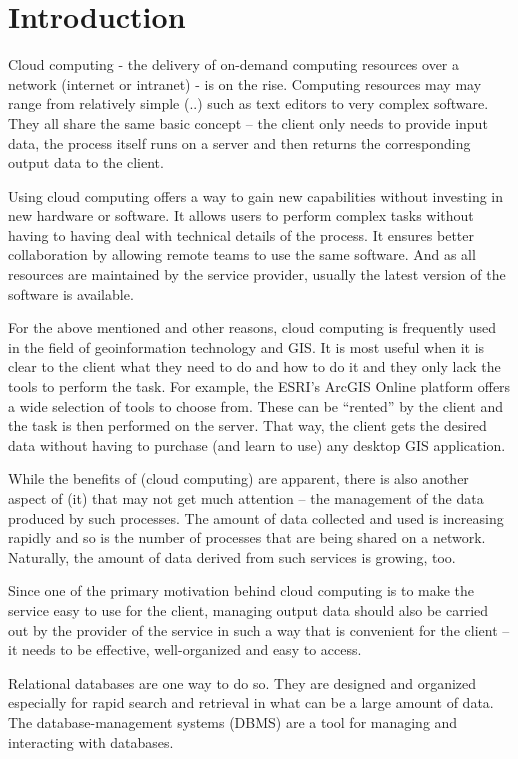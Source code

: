 \chapter{Introduction}
\label{1-introduction}

	Cloud computing - the delivery of on-demand computing resources over a network (internet or intranet) -  is on the rise. Computing resources may may range from relatively simple (..) such as text editors to very complex software. They all share the same basic concept – the client only needs to provide input data, the process itself runs on a server and then returns the corresponding output data to the client.

Using cloud computing offers a way to gain new capabilities without investing in new hardware or software. It allows users to perform complex tasks without having to having deal with technical details of the process. It ensures better collaboration by allowing remote teams to use the same software. And as all resources are maintained by the service provider, usually the latest version of the software is available.


For the above mentioned and other reasons, cloud computing is frequently used in the field of geoinformation technology and GIS. It is most useful when it is clear to the client what they need to do and how to do it and they only lack the tools to perform the task. For example, the ESRI’s ArcGIS Online platform offers a wide selection of tools to choose from. These can be “rented” by the client and the task is then performed on the server. That way, the client gets the desired data without having to purchase (and learn to use) any desktop GIS application.

While the benefits of (cloud computing) are apparent, there is also another aspect of (it) that may not get much attention – the management of the data produced by such processes. The amount of data collected and used is increasing rapidly and so is the number of processes that are being shared on a network. Naturally, the amount of data derived from such services is growing, too. 

Since one of the primary motivation behind cloud computing is to make the service easy to use for the client, managing output data should also be carried out by the provider of the service in such a way that is  convenient for the client – it needs to be effective, well-organized and easy to access.

	Relational databases are one way to do so. They are designed and organized especially for rapid search and retrieval in what can be a large amount of data. The database-management systems (DBMS) are a tool for managing and interacting with databases. 
	
